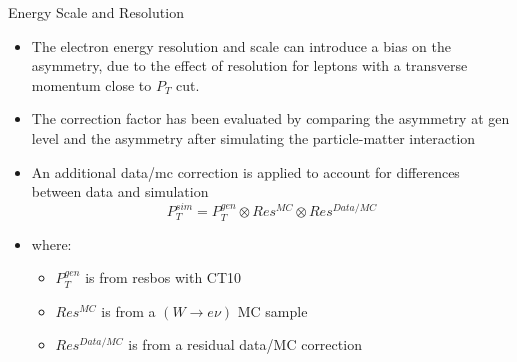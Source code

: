 \documentclass[t, 8pt]{beamer}
\begin{document}
\begin{frame}{Energy Scale and Resolution}
    \begin{itemize}
      \item The electron energy resolution and scale can introduce a bias on the
      asymmetry, due to the effect of resolution for leptons with a transverse
      momentum close to $P_T$ cut.
      \item The correction factor has been evaluated by comparing the asymmetry at gen level and the asymmetry after simulating the particle-matter interaction
      \item An additional data/mc correction is applied to account for differences between data and simulation
      \begin{equation}
      P_T^{sim} = P_T^{gen} \otimes Res^{MC} \otimes Res^{Data/MC}
      \end{equation}
      \item where:
      \begin{itemize} 
        \item $P_T^{gen}$ is from resbos with CT10
        \item $Res^{MC}$ is from a $(W\to e\nu)$ MC sample
        \item $Res^{Data/MC}$ is from a residual data/MC correction 
      \end{itemize}
    \end{itemize}
\end{frame}
\end{document}
